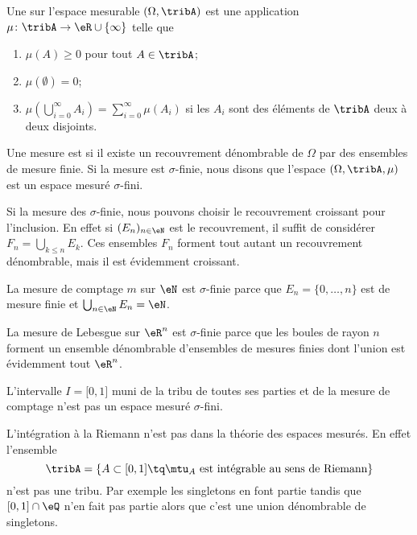 \begin{definition}  \label{DefBTsgznn}
    Une  sur l'espace mesurable \( (\Omega,\tribA)\) est une application \( \mu\colon \tribA\to \eR\cup\{ \infty \}\) telle que
    \begin{enumerate}
        \item
            \( \mu(A)\geq 0\) pour tout \( A\in\tribA\);
        \item
            \( \mu(\emptyset)=0\);
        \item   \label{ItemQFjtOjXiii}
            \( \mu\left( \bigcup_{i=0}^{\infty}A_i\right)=\sum_{i=0}^{\infty}\mu(A_i)\) si les \( A_i\) sont des éléments de \( \tribA\) deux à deux disjoints.
    \end{enumerate}
    Une mesure est  si il existe un recouvrement dénombrable de \( \Omega\) par des ensembles de mesure finie. Si la mesure est $\sigma$-finie, nous disons que l'espace \( (\Omega,\tribA,\mu)\) est un espace mesuré $\sigma$-fini.
\end{definition}

Si la mesure des \( \sigma\)-finie, nous pouvons choisir le recouvrement croissant pour l'inclusion. En effet si \( (E_n)_{n\in \eN}\) est le recouvrement, il suffit de considérer \( F_n=\bigcup_{k\leq n}E_k\). Ces ensembles \( F_n\) forment tout autant un recouvrement dénombrable, mais il est évidemment croissant.

\begin{example}
    La mesure de comptage \( m\) sur \( \eN\) est \( \sigma\)-finie parce que \( E_n=\{ 0,\ldots, n \}\) est de mesure finie et \( \bigcup_{n\in \eN}E_n=\eN\).
\end{example}

\begin{example}
    La mesure de Lebesgue sur \( \eR^n\) est \( \sigma\)-finie parce que les boules de rayon \( n\) forment un ensemble dénombrable d'ensembles de mesures finies dont l'union est évidemment tout \( \eR^n\).

    L'intervalle \( I=\mathopen[ 0 , 1 \mathclose]\) muni de la tribu de toutes ses parties et de la mesure de comptage n'est pas un espace mesuré \( \sigma\)-fini.
\end{example}

\begin{example}
    L'intégration à la Riemann n'est pas dans la théorie des espaces mesurés. En effet l'ensemble 
    \begin{equation}
        \tribA=\{   A\subset\mathopen[ 0 , 1 \mathclose]\tq  \text{\( \mtu_A\) est intégrable au sens de Riemann}   \}
    \end{equation}
    n'est pas une tribu. Par exemple les singletons en font partie tandis que \( \mathopen[ 0 , 1 \mathclose]\cap \eQ\) n'en fait pas partie alors que c'est une union dénombrable de singletons.
\end{example}

